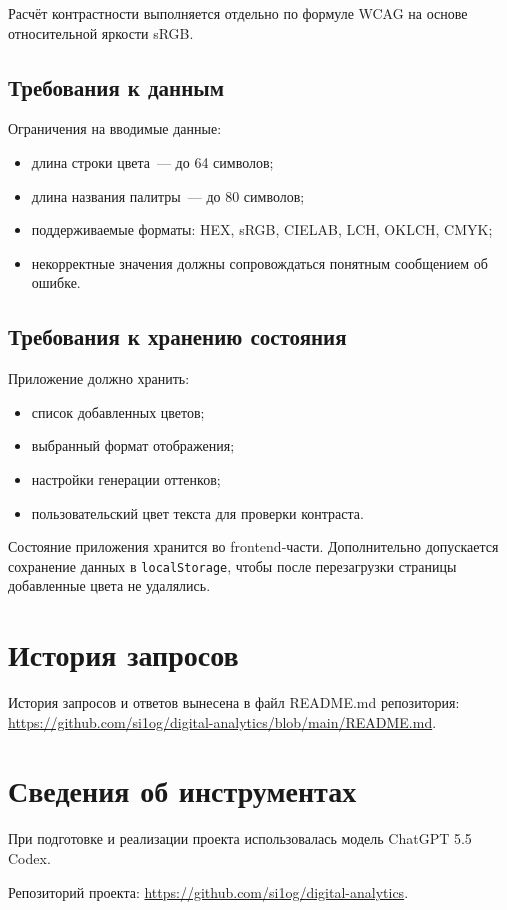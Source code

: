 Расчёт контрастности выполняется отдельно по формуле WCAG на основе относительной яркости sRGB.

\subsection*{Требования к данным}

Ограничения на вводимые данные:

\begin{itemize}
    \item длина строки цвета~--- до 64 символов;
    \item длина названия палитры~--- до 80 символов;
    \item поддерживаемые форматы: HEX, sRGB, CIELAB, LCH, OKLCH, CMYK;
    \item некорректные значения должны сопровождаться понятным сообщением об ошибке.
\end{itemize}

\subsection*{Требования к хранению состояния}

Приложение должно хранить:

\begin{itemize}
    \item список добавленных цветов;
    \item выбранный формат отображения;
    \item настройки генерации оттенков;
    \item пользовательский цвет текста для проверки контраста.
\end{itemize}

Состояние приложения хранится во frontend-части. Дополнительно допускается сохранение данных в \texttt{localStorage}, чтобы после перезагрузки страницы добавленные цвета не удалялись.


\section{История запросов}

История запросов и ответов вынесена в файл README.md репозитория:
\url{https://github.com/si1og/digital-analytics/blob/main/README.md}.


\section{Сведения об инструментах}

При подготовке и реализации проекта использовалась модель ChatGPT 5.5 Codex.

Репозиторий проекта: \url{https://github.com/si1og/digital-analytics}.
